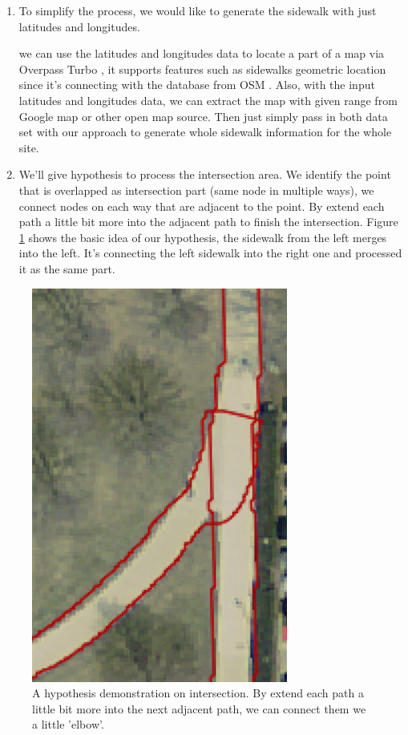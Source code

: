 \begin{enumerate}
    \item To simplify the process, we would like to generate the sidewalk with just latitudes and longitudes.
    
    we can use the latitudes and longitudes data to locate a part of a map via Overpass Turbo \cite{overpass_turbo}, it supports features such as sidewalks geometric location since it's connecting with the database from \ac{OSM} \cite{OpenStreetMap}. Also, with the input latitudes and longitudes data, we can extract the map with given range from Google map or other open map source. Then just simply pass in both data set with our approach to generate whole sidewalk information for the whole site. 
    
    \item We'll give hypothesis to process the intersection area. We identify the point that is overlapped as intersection part (same node in multiple ways), we connect nodes on each way that are adjacent to the point. By extend each path a little bit more into the adjacent path to finish the intersection. Figure \ref{fig:intersection} shows the basic idea of our hypothesis, the sidewalk from the left merges into the left. It's connecting the left sidewalk into the right one and processed it as the same part. 
    
\end{enumerate}

\begin{figure}
    \centering
    \includegraphics[width=0.75\textwidth]{Figures/intersection.png}
    \caption[Intersection Demonstration]{A hypothesis demonstration on intersection. By extend each path a little bit more into the next adjacent path, we can connect them we a little 'elbow'.}
    \label{fig:intersection}
\end{figure}

